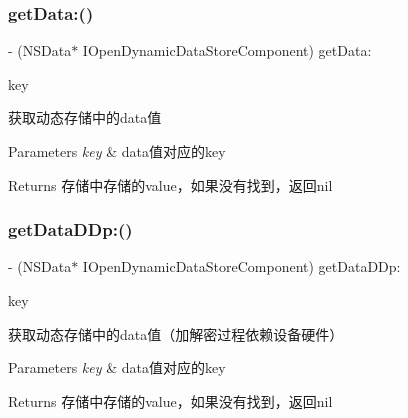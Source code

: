 \subsubsection{\texorpdfstring{get\+Data\+:()}{getData:()}}
{\footnotesize\ttfamily -\/ (N\+S\+Data$\ast$ I\+Open\+Dynamic\+Data\+Store\+Component) get\+Data\+: \begin{DoxyParamCaption}\item[{(N\+S\+String $\ast$)}]{key }\end{DoxyParamCaption}}

获取动态存储中的data值 
\begin{DoxyParams}{Parameters}
{\em key} & data值对应的key \\
\hline
\end{DoxyParams}
\begin{DoxyReturn}{Returns}
存储中存储的value，如果没有找到，返回nil 
\end{DoxyReturn}
\mbox{\label{protocol_i_open_dynamic_data_store_component_01-p_a8a4eacea2b085ad149596188cf81a9f7}} 
\subsubsection{\texorpdfstring{get\+Data\+D\+Dp\+:()}{getDataDDp:()}}
{\footnotesize\ttfamily -\/ (N\+S\+Data$\ast$ I\+Open\+Dynamic\+Data\+Store\+Component) get\+Data\+D\+Dp\+: \begin{DoxyParamCaption}\item[{(N\+S\+String $\ast$)}]{key }\end{DoxyParamCaption}}

获取动态存储中的data值（加解密过程依赖设备硬件） 
\begin{DoxyParams}{Parameters}
{\em key} & data值对应的key \\
\hline
\end{DoxyParams}
\begin{DoxyReturn}{Returns}
存储中存储的value，如果没有找到，返回nil 
\end{DoxyReturn}
\mbox{\label{protocol_i_open_dynamic_data_store_component_01-p_af49407daaff91f7747b4d20505326d70}} 

